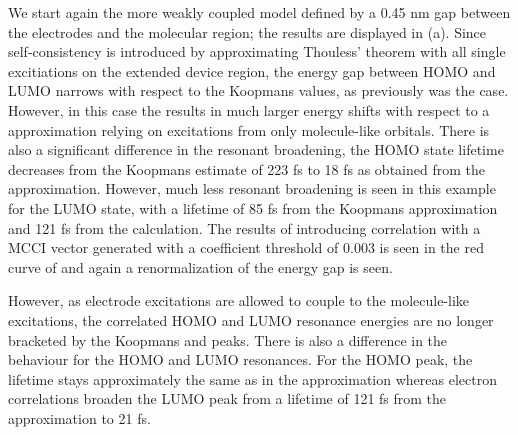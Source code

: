 We start again the more weakly coupled model defined by a 0.45 nm gap
between the electrodes and the molecular region;
the results are displayed in (a). 
Since self-consistency is introduced by approximating Thouless' theorem
with all single excitiations on the extended device region, the energy gap
between HOMO and LUMO narrows with respect to the Koopmans values, as
previously was the case. However, in this case the \dscf results
in much larger energy shifts with respect to a \dscf approximation
relying on excitations from only molecule-like orbitals. There is also a
significant difference in the resonant broadening, the HOMO state lifetime
decreases from the Koopmans estimate of 223 fs to 18 fs as obtained from
the \dscf approximation. 
However, much less resonant broadening is seen in this example for the
LUMO state, with a lifetime of 85 fs from the Koopmans approximation
and 121 fs from the \dscf calculation. The results of introducing
correlation with a MCCI vector generated with a coefficient threshold of
0.003 is seen in the red curve of  and again a
renormalization of the energy gap is seen.

However, as electrode excitations are allowed to couple to the
molecule-like excitations, the correlated HOMO and LUMO resonance energies
are no longer bracketed by the Koopmans and \dscf peaks.
There is also a difference in the behaviour for the HOMO and LUMO resonances.
For the HOMO peak, the lifetime stays approximately the same as in the
\dscf approximation whereas electron correlations broaden the LUMO
peak from a lifetime of 121 fs from the \dscf approximation to 21
fs. 

